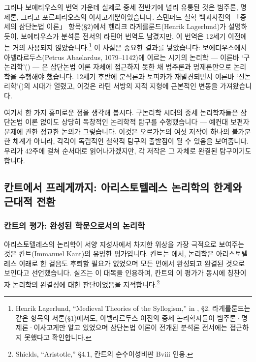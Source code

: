 \documentclass[12pt, a4paper]{article}
\begin{document}
그러나 보에티우스의 번역 가운데 실제로 중세 전반기에 널리 유통된 것은 범주론, 명제론, 그리고 포르피리오스의 이사고게뿐이었습니다. 스탠퍼드 철학 백과사전의 「중세의 삼단논법 이론」 항목(§2)에서 헨리크 라게를룬드(Henrik Lagerlund)가 설명하듯이, 보에티우스가 분석론 전서의 라틴어 번역도 남겼지만, 이 번역은 12세기 이전에는 거의 사용되지 않았습니다.\footnote{Henrik Lagerlund, ``Medieval Theories of the Syllogism,'' in , §2. 라게를룬드는 같은 항목의 서론(§1)에서도, 아벨라르두스 이전의 중세 논리학자들이 범주론·명제론·이사고게만 알고 있었으며 삼단논법 이론이 전개된 분석론 전서에는 접근하지 못했다고 확인합니다.} 이 사실은 중요한 결과를 낳았습니다: 보에티우스에서 아벨라르두스(Petrus Abaelardus, 1079--1142)에 이르는 시기의 논리학 --- 이른바 `구논리학'() --- 은 삼단논법 이론 자체에 접근하지 못한 채 범주론과 명제론만으로 논리학을 수행해야 했습니다. 12세기 후반에 분석론과 토피카가 재발견되면서 이른바 `신논리학'()의 시대가 열렸고, 이것은 라틴 서방의 지적 지형에 근본적인 변동을 가져왔습니다.

여기서 한 가지 흥미로운 점을 생각해 봅시다. 구논리학 시대의 중세 논리학자들은 삼단논법 이론 없이도 상당히 독창적인 논리학적 탐구를 수행했습니다 --- 예컨대 보편자 문제에 관한 정교한 논의가 그렇습니다. 이것은 오르가논의 여섯 저작이 하나의 불가분한 체계가 아니라, 각각이 독립적인 철학적 탐구의 출발점이 될 수 있음을 보여줍니다. 우리가 42주에 걸쳐 순서대로 읽어나가겠지만, 각 저작은 그 자체로 완결된 탐구이기도 합니다.

\subsection{칸트에서 프레게까지: 아리스토텔레스 논리학의 한계와 근대적 전환}

\subsubsection{칸트의 평가: 완성된 학문으로서의 논리학}

아리스토텔레스의 논리학이 서양 지성사에서 차지한 위상을 가장 극적으로 보여주는 것은 칸트(Immanuel Kant)의 유명한 평가입니다. 칸트는 에서, 논리학은 아리스토텔레스 이래로 한 걸음도 후퇴할 필요가 없었으며 모든 면에서 완성되고 완결된 것으로 보인다고 선언했습니다. 실즈는 이 대목을 인용하며, 칸트의 이 평가가 동시에 칭찬이자 논리학의 완결성에 대한 판단이었음을 지적합니다.\footnote{Shields, ``Aristotle,'' §4.1, 칸트의 순수이성비판 Bviii 인용.}
\end{document}

